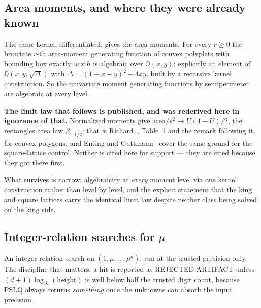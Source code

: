 \documentclass[11pt]{article}
\newcommand{\Q}{\mathbb{Q}}
\begin{document}
\subsection{Area moments, and where they were already known}
\label{sec:moments}

The same kernel, differentiated, gives the area moments. For every $r \ge 0$ the
bivariate $r$-th area-moment generating function of convex polyplets with
bounding box exactly $w \times h$ is algebraic over $\Q(x,y)$: explicitly an
element of $\Q(x,y,\sqrt{\Delta})$ with $\Delta = (1-x-y)^2 - 4xy$, built by a
recursive kernel construction. So the univariate moment generating functions
by semiperimeter are algebraic at every level.

\textbf{The limit law that follows is published, and was rederived here in
ignorance of that.} Normalized moments give
$\mathrm{area}/s^2 \to U(1-U)/2$, the rectangles area law
$\beta_{1,1/2}$; that is Richard~\cite{richard2007}, Table~1 and the remark
following it, for convex polygons, and Enting and
Guttmann~\cite{entingGuttmann1989} cover the same ground for the square-lattice
control. Neither is cited here for support --- they are cited because they got
there first.

What survives is narrow: algebraicity at
\emph{every} moment level via one kernel construction rather than level by
level, and the explicit statement that the king and square lattices carry the
identical limit law despite neither class being solved on the king side.

\subsection{Integer-relation searches for \texorpdfstring{$\mu$}{mu}}

An integer-relation search on $(1,\mu,\dots,\mu^d)$, run at the trusted
precision only. The discipline that matters: a hit is reported as
REJECTED-ARTIFACT unless $(d{+}1)\log_{10}(\text{height})$ is well below half
the trusted digit count, because PSLQ always returns \emph{something} once the
unknowns can absorb the input precision.
\end{document}
